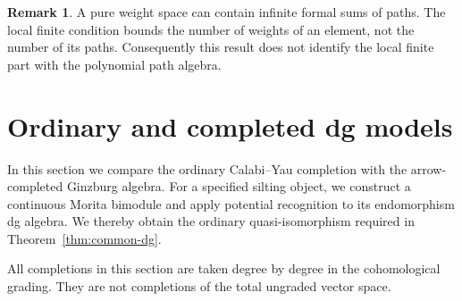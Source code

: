 \documentclass[12pt,a4paper,english,reqno]{amsart}
\theoremstyle{plain}
\theoremstyle{definition}
\newtheorem{rmk}[thm]{Remark}
\numberwithin{equation}{section}
\newcommand{\thmref}[1]{Theorem~\ref{#1}}
\begin{document}
\begin{rmk}\label{rem:formal-weights}
A pure weight space can contain infinite formal sums of paths. The local finite condition bounds the number of weights of an element, not the number of its paths. Consequently this result does not identify the local finite part with the polynomial path algebra.
\end{rmk}



\section{Ordinary and completed dg models}\label{sec:completion}
In this section we compare the ordinary Calabi--Yau completion with the arrow-completed Ginzburg algebra. For a specified silting object, we construct a continuous Morita bimodule and apply potential recognition to its endomorphism dg algebra. We thereby obtain the ordinary quasi-isomorphism required in \thmref{thm:common-dg}.

All completions in this section are taken degree by degree in the cohomological grading. They are not completions of the total ungraded vector space.
\end{document}
